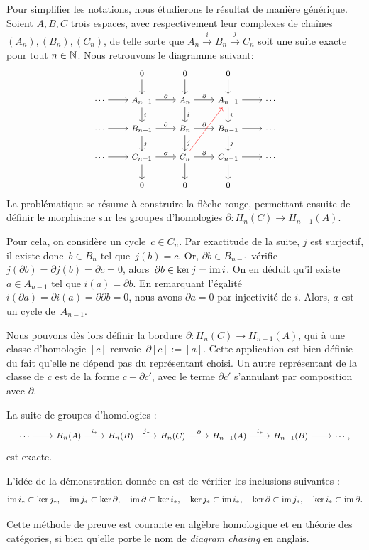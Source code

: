 \bigskip Pour simplifier les notations, nous étudierons le résultat de manière générique. Soient $A,B,C$ trois espaces, avec respectivement leur complexes de chaînes $(A_n),(B_n),(C_n)$, de telle sorte que $A_n\xrightarrow{i} B_n\xrightarrow{j} C_n$ soit une suite exacte pour tout $n\in\mathbb{N}$. Nous retrouvons le diagramme suivant: 
\[
\footnotesize
\begin{tikzcd}
&0\arrow[d]&0\arrow[d]&0\arrow[d]&\\
\cdots\arrow[r]&A_{n+1}\arrow[r, "\partial"]\arrow[d,"i"]&A_n\arrow[r, "\partial"]\arrow[d,"i"]&A_{n-1}\arrow[r]\arrow[d,"i"]&\cdots\\
\cdots\arrow[r]&B_{n+1}\arrow[r, "\partial"]\arrow[d,"j"]&B_n\arrow[r, "\partial"]\arrow[d,"j"]&B_{n-1}\arrow[r]\arrow[d,"j"]&\cdots\\
\cdots\arrow[r]&C_{n+1}\arrow[r, "\partial"]\arrow[d]&C_n\arrow[r, "\partial"]\arrow[ruu, red]\arrow[d]&C_{n-1}\arrow[r]\arrow[d]&\cdots\\
&0&0&0&
\end{tikzcd}\]La problématique se résume à construire la flèche rouge, permettant ensuite de définir le morphisme sur les groupes d'homologies $\partial:H_n(C)\to H_{n-1}(A)$. 

Pour cela, on considère un cycle~$ c\in C_n$. Par exactitude de la suite, $j$ est surjectif, il existe donc~$b\in B_n$ tel que~$j(b)=c$. Or, $\partial b\in B_{n-1}$ vérifie $j(\partial b)=\partial j(b)=\partial c=0$, alors~$\partial b\in \ker j=\mathrm{im}\, i$. On en déduit qu'il existe $a\in A_{n-1}$ tel que $i(a)=\partial b$. En remarquant l'égalité $i(\partial a)=\partial i(a)=\partial\partial b=0$, nous avons $\partial a=0$ par injectivité de $i$. Alors, $a$ est un cycle de~$A_{n-1}$.

Nous pouvons dès lors définir la bordure $\partial:H_n(C)\to H_{n-1}(A)$, qui à une classe d'homologie $[c]$ renvoie~$\partial[c]:=[a]$. Cette application est bien définie du fait qu'elle ne dépend pas du représentant choisi. Un autre représentant de la classe de $c$ est de la forme $c+\partial c'$, avec le terme $\partial c'$ s'annulant par composition avec $\partial$.

\begin{theorem}
La suite de groupes d'homologies : \[\footnotesize\begin{tikzcd}
\cdots\arrow[r]&H_n(A)\arrow[r,"i_\ast"]&H_n(B)\arrow[r,"j_\ast"]&H_n(C)\arrow[r,"\partial"]&H_{n-1}(A)\arrow[r,"i_\ast"]&H_{n-1}(B)\arrow[r]&\cdots,
\end{tikzcd}\]est exacte.
\end{theorem}
L'idée de la démonstration donnée en \cite[][Theorem~2.16]{Hatcher} est de vérifier les inclusions suivantes : \[\mathrm{im}\, i_\ast\subset \ker j_\ast,\quad\mathrm{im}\, j_\ast\subset\ker\partial,\quad\mathrm{im}\,\partial\subset\ker i_\ast,\quad\ker j_\ast\subset\mathrm{im}\, i_\ast,\quad\ker\partial\subset\mathrm{im}\, j_\ast,\quad\ker i_\ast\subset \mathrm{im}\,\partial.\]
\begin{remark}
Cette méthode de preuve est courante en algèbre homologique et en théorie des catégories, si bien qu'elle porte le nom de \emph{diagram chasing} en anglais.
\end{remark}

